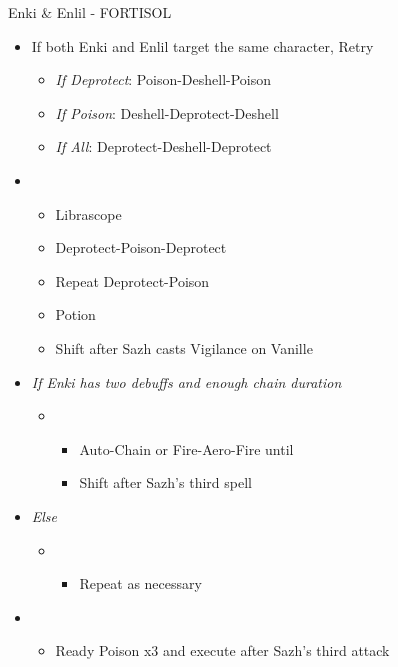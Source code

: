 \begin{battle}[1:30]{Enki \& Enlil - FORTISOL}

		\begin{itemize}
			\item If both Enki and Enlil target the same character, Retry
			      \begin{itemize}
				      \item \textit{If Deprotect}: Poison-Deshell-Poison
				      \item \textit{If Poison}: Deshell-Deprotect-Deshell
				      \item \textit{If All}: Deprotect-Deshell-Deprotect
			      \end{itemize}
			\item \third
			      \begin{itemize}
				      \item Librascope
				      \item Deprotect-Poison-Deprotect
				      \item Repeat Deprotect-Poison
				      \item Potion
				      \item Shift after Sazh casts Vigilance on Vanille
			      \end{itemize}
			\item \textit{If Enki has two debuffs and enough chain duration}
			      \begin{itemize}
				      \item \fourth
				            \begin{itemize}
					            \item Auto-Chain or Fire-Aero-Fire until \stagger
					            \item Shift after Sazh's third spell
				            \end{itemize}
			      \end{itemize}
			\item \textit{Else}
			      \begin{itemize}
				      \item \fifth
				            \begin{itemize}
					            \item Repeat as necessary
				            \end{itemize}
			      \end{itemize}
			\item \sixth
			      \begin{itemize}
				      \item Ready Poison x3 and execute after Sazh's third attack

\end{itemize}
\end{itemize}
\end{battle}
